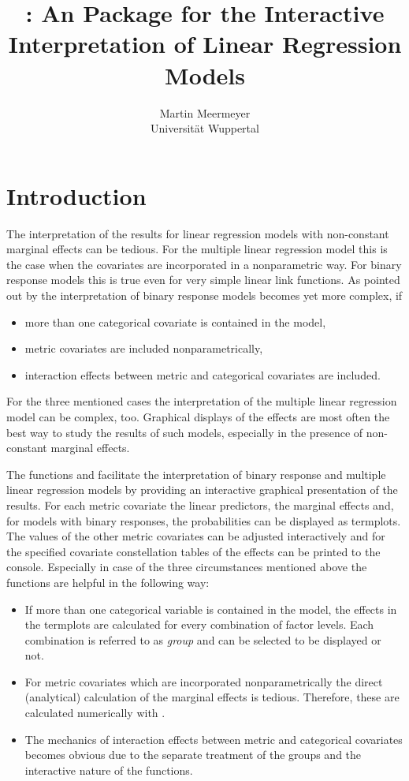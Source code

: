 \documentclass[nojss]{jss}
\author{Martin Meermeyer\\ Universit\"at Wuppertal}
\title{\pkg{LinRegInteractive}: An \proglang{R} Package for the Interactive Interpretation of Linear Regression Models}
\begin{document}
\section{Introduction} \label{sec-intro}
The interpretation of the results for linear regression models with non-constant marginal effects can be tedious. For the multiple linear regression model this is the case when the covariates are incorporated in a nonparametric way. For binary response models this is true even for very simple linear link functions. As pointed out by \citet{Hoet2007} the interpretation of  binary response models becomes yet more complex, if
\begin{itemize} [leftmargin=1cm, rightmargin=0.5cm, label=$\bullet$]
\item more than one categorical covariate is contained in the model,
\item metric covariates are included nonparametrically,
\item interaction effects between metric and categorical covariates are included.
\end{itemize}
For the three mentioned cases the interpretation of the multiple linear regression model can be complex, too. Graphical displays of the effects are most often the best way to study the results of such models, especially in the presence of non-constant marginal effects.

The functions  and  facilitate the interpretation of binary response and multiple linear regression models by providing an interactive graphical presentation of the results. For each metric covariate the linear predictors, the marginal effects and, for models with binary responses, the probabilities can be displayed as termplots. The values of the other metric covariates can be adjusted interactively and for the specified covariate constellation tables of the effects can be printed to the console. Especially in case of the three circumstances mentioned above the functions are helpful in the following way:
\begin{itemize} [leftmargin=1cm, rightmargin=0.5cm, label=$\bullet$]
\item If more than one categorical variable is contained in the model, the effects in the termplots are calculated for every combination of factor levels. Each combination is referred to as \emph{group} and can be selected to be displayed or not.
\item For metric covariates which are incorporated nonparametrically the direct (analytical) calculation of the marginal effects is tedious. Therefore, these are calculated numerically with .
\item The mechanics of interaction effects between metric and categorical covariates becomes obvious due to the separate treatment of the groups  and the interactive nature of the functions.
\end{itemize}
\end{document}
